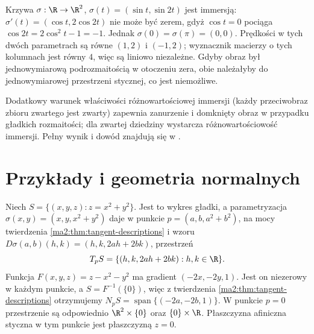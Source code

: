 \begin{przyklad}
\label{ma2:ex:immersed-crossing}
Krzywa $\sigma:\R\to\R^2$, $\sigma(t)=(\sin t,\sin 2t)$
jest immersją: $\sigma'(t)=(\cos t,2\cos 2t)$ nie
może być zerem, gdyż $\cos t=0$ pociąga
$\cos 2t=2\cos^2t-1=-1$. Jednak
$\sigma(0)=\sigma(\pi)=(0,0)$.
Prędkości w tych dwóch parametrach są równe
$(1,2)$ i $(-1,2)$; wyznacznik macierzy o tych
kolumnach jest równy $4$, więc są liniowo niezależne.
Gdyby obraz był jednowymiarową podrozmaitością
w otoczeniu zera, obie należałyby do jednowymiarowej
przestrzeni stycznej, co jest niemożliwe.
\end{przyklad}

Dodatkowy warunek właściwości różnowartościowej immersji
(każdy przeciwobraz zbioru zwartego jest zwarty)
zapewnia zanurzenie i domknięty obraz w przypadku
gładkich rozmaitości; dla zwartej dziedziny wystarcza
różnowartościowość immersji. Pełny wynik i dowód znajdują się w
.

\section{Przykłady i geometria normalnych}

\begin{przyklad}[Paraboloida]
\label{ma2:ex:submanifold-paraboloid}
Niech $S=\{(x,y,z):z=x^2+y^2\}$.
Jest to wykres gładki, a parametryzacja
$\sigma(x,y)=(x,y,x^2+y^2)$ daje w punkcie
$p=(a,b,a^2+b^2)$, na mocy twierdzenia
\ref{ma2:thm:tangent-descriptions} i wzoru
$D\sigma(a,b)(h,k)=(h,k,2ah+2bk)$, przestrzeń
\[
 T_pS=\{(h,k,2ah+2bk):h,k\in\R\}.
\]
Funkcja $F(x,y,z)=z-x^2-y^2$ ma gradient
$(-2x,-2y,1)$. Jest on niezerowy w każdym punkcie,
a $S=F^{-1}(\{0\})$, więc z twierdzenia
\ref{ma2:thm:tangent-descriptions} otrzymujemy
$N_pS=\operatorname{span}\{(-2a,-2b,1)\}$.
W punkcie $p=0$ przestrzenie są odpowiednio
$\R^2\times\{0\}$ oraz $\{0\}\times\R$.
Płaszczyzna afiniczna styczna w tym punkcie jest
płaszczyzną $z=0$.
\end{przyklad}


